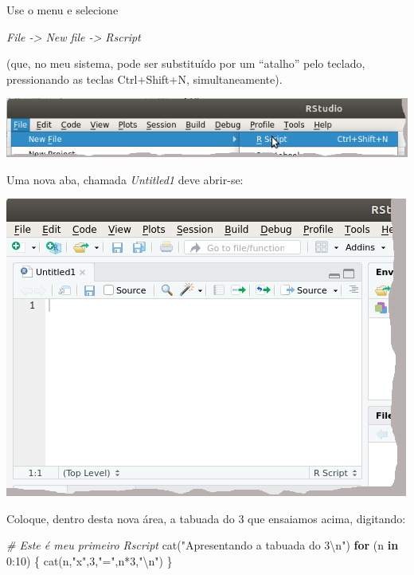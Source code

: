 \documentclass[
]{article}
\newenvironment{Shaded}{\begin{snugshade}}{\end{snugshade}}
\newcommand{\CommentTok}[1]{\textcolor[rgb]{0.56,0.35,0.01}{\textit{#1}}}
\newcommand{\ControlFlowTok}[1]{\textcolor[rgb]{0.13,0.29,0.53}{\textbf{#1}}}
\newcommand{\DecValTok}[1]{\textcolor[rgb]{0.00,0.00,0.81}{#1}}
\newcommand{\FunctionTok}[1]{\textcolor[rgb]{0.00,0.00,0.00}{#1}}
\newcommand{\NormalTok}[1]{#1}
\newcommand{\SpecialCharTok}[1]{\textcolor[rgb]{0.00,0.00,0.00}{#1}}
\newcommand{\StringTok}[1]{\textcolor[rgb]{0.31,0.60,0.02}{#1}}
\begin{document}
Use o menu e selecione

\emph{File -\textgreater{} New file -\textgreater{} Rscript}

(que, no meu sistema, pode ser substituído por um ``atalho'' pelo
teclado, pressionando as teclas Ctrl+Shift+N, simultaneamente).

\begin{center}\includegraphics[width=0.9\linewidth]{RStudio_RScriptnovo} \end{center}

Uma nova aba, chamada \emph{Untitled1} deve abrir-se:

\begin{center}\includegraphics[width=0.9\linewidth]{RStudio_newfile} \end{center}

Coloque, dentro desta nova área, a tabuada do 3 que ensaiamos acima,
digitando:

\begin{Shaded}
\begin{Highlighting}[]
\CommentTok{\# Este é meu primeiro Rscript}
\FunctionTok{cat}\NormalTok{(}\StringTok{"Apresentando a tabuada do 3}\SpecialCharTok{\textbackslash{}n}\StringTok{"}\NormalTok{)}
\ControlFlowTok{for}\NormalTok{ (n }\ControlFlowTok{in} \DecValTok{0}\SpecialCharTok{:}\DecValTok{10}\NormalTok{) }
\NormalTok{\{}
  \FunctionTok{cat}\NormalTok{(n,}\StringTok{"x"}\NormalTok{,}\DecValTok{3}\NormalTok{,}\StringTok{"="}\NormalTok{,n}\SpecialCharTok{*}\DecValTok{3}\NormalTok{,}\StringTok{"}\SpecialCharTok{\textbackslash{}n}\StringTok{"}\NormalTok{)}
\NormalTok{\}}
\end{Highlighting}
\end{Shaded}
\end{document}
